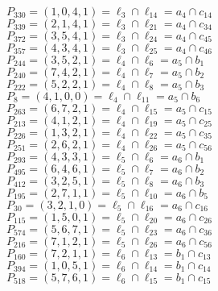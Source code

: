 \documentclass{article}
\begin{document}
{\begin{multicols}{2}
$P_{330} = ( 1, 0, 4, 1 ) = \ell_{3} \cap \ell_{14}  = a_{4} \cap c_{14}$\\
$P_{339} = ( 2, 1, 4, 1 ) = \ell_{3} \cap \ell_{21}  = a_{4} \cap c_{34}$\\
$P_{372} = ( 3, 5, 4, 1 ) = \ell_{3} \cap \ell_{24}  = a_{4} \cap c_{45}$\\
$P_{357} = ( 4, 3, 4, 1 ) = \ell_{3} \cap \ell_{25}  = a_{4} \cap c_{46}$\\
$P_{244} = ( 3, 5, 2, 1 ) = \ell_{4} \cap \ell_{6}  = a_{5} \cap b_{1}$\\
$P_{240} = ( 7, 4, 2, 1 ) = \ell_{4} \cap \ell_{7}  = a_{5} \cap b_{2}$\\
$P_{222} = ( 5, 2, 2, 1 ) = \ell_{4} \cap \ell_{8}  = a_{5} \cap b_{3}$\\
$P_{8} = ( 4, 1, 0, 0 ) = \ell_{4} \cap \ell_{11}  = a_{5} \cap b_{6}$\\
$P_{263} = ( 6, 7, 2, 1 ) = \ell_{4} \cap \ell_{15}  = a_{5} \cap c_{15}$\\
$P_{213} = ( 4, 1, 2, 1 ) = \ell_{4} \cap \ell_{19}  = a_{5} \cap c_{25}$\\
$P_{226} = ( 1, 3, 2, 1 ) = \ell_{4} \cap \ell_{22}  = a_{5} \cap c_{35}$\\
$P_{251} = ( 2, 6, 2, 1 ) = \ell_{4} \cap \ell_{26}  = a_{5} \cap c_{56}$\\
$P_{293} = ( 4, 3, 3, 1 ) = \ell_{5} \cap \ell_{6}  = a_{6} \cap b_{1}$\\
$P_{495} = ( 6, 4, 6, 1 ) = \ell_{5} \cap \ell_{7}  = a_{6} \cap b_{2}$\\
$P_{412} = ( 3, 2, 5, 1 ) = \ell_{5} \cap \ell_{8}  = a_{6} \cap b_{3}$\\
$P_{195} = ( 2, 7, 1, 1 ) = \ell_{5} \cap \ell_{10}  = a_{6} \cap b_{5}$\\
$P_{30} = ( 3, 2, 1, 0 ) = \ell_{5} \cap \ell_{16}  = a_{6} \cap c_{16}$\\
$P_{115} = ( 1, 5, 0, 1 ) = \ell_{5} \cap \ell_{20}  = a_{6} \cap c_{26}$\\
$P_{574} = ( 5, 6, 7, 1 ) = \ell_{5} \cap \ell_{23}  = a_{6} \cap c_{36}$\\
$P_{216} = ( 7, 1, 2, 1 ) = \ell_{5} \cap \ell_{26}  = a_{6} \cap c_{56}$\\
$P_{160} = ( 7, 2, 1, 1 ) = \ell_{6} \cap \ell_{13}  = b_{1} \cap c_{13}$\\
$P_{394} = ( 1, 0, 5, 1 ) = \ell_{6} \cap \ell_{14}  = b_{1} \cap c_{14}$\\
$P_{518} = ( 5, 7, 6, 1 ) = \ell_{6} \cap \ell_{15}  = b_{1} \cap c_{15}$\\

\end{multicols}}
\end{document}
